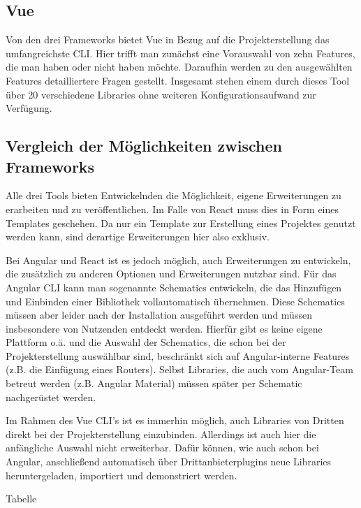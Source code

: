 \subsection{Vue}
Von den drei Frameworks bietet Vue in Bezug auf die Projekterstellung das umfangreichste CLI. Hier trifft man zunächst eine Vorauswahl von zehn Features, die man haben oder nicht haben möchte. Daraufhin werden zu den ausgewählten Features detailliertere Fragen gestellt. Insgesamt stehen einem durch dieses Tool über 20 verschiedene Libraries ohne weiteren Konfigurationsaufwand zur Verfügung.


\subsection{Vergleich der Möglichkeiten zwischen Frameworks}
Alle drei Tools bieten Entwickelnden die Möglichkeit, eigene Erweiterungen zu erarbeiten und zu veröffentlichen. Im Falle von React muss dies in Form eines Templates geschehen. Da nur ein Template zur Erstellung eines Projektes genutzt werden kann, sind derartige Erweiterungen hier also exklusiv.

Bei Angular und React ist es jedoch möglich, auch Erweiterungen zu entwickeln, die zusätzlich zu anderen Optionen und Erweiterungen nutzbar sind. Für das Angular \gls{CLI} kann man sogenannte Schematics entwickeln, die das Hinzufügen und Einbinden einer Bibliothek vollautomatisch übernehmen. Diese Schematics müssen aber leider nach der Installation ausgeführt werden und müssen insbesondere von Nutzenden entdeckt werden. Hierfür gibt es keine eigene Plattform o.ä. und die Auswahl der Schematics, die schon bei der Projekterstellung auswählbar sind, beschränkt sich auf Angular-interne Features (z.B. die Einfügung eines Routers). Selbst Libraries, die auch vom Angular-Team betreut werden (z.B. Angular Material) müssen später per Schematic nachgerüstet werden.

Im Rahmen des Vue \gls{CLI}'s ist es immerhin möglich, auch Libraries von Dritten direkt bei der Projekterstellung einzubinden. Allerdings ist auch hier die anfängliche Auswahl nicht erweiterbar. Dafür können, wie auch schon bei Angular, anschließend automatisch über Drittanbieterplugins neue Libraries heruntergeladen, importiert und demonstriert werden.

Tabelle 

